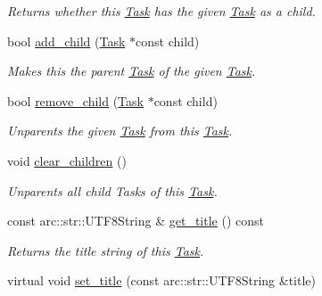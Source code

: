 \begin{DoxyCompactItemize}
\begin{DoxyCompactList}\small\item\em Returns whether this \hyperlink{classsigma_1_1core_1_1tasks_1_1_task}{Task} has the given \hyperlink{classsigma_1_1core_1_1tasks_1_1_task}{Task} as a child. \end{DoxyCompactList}\item 
bool \hyperlink{classsigma_1_1core_1_1tasks_1_1_task_abac88c4ddaf54ae20aab497e95023f9e}{add\-\_\-child} (\hyperlink{classsigma_1_1core_1_1tasks_1_1_task}{Task} $\ast$const child)
\begin{DoxyCompactList}\small\item\em Makes this the parent \hyperlink{classsigma_1_1core_1_1tasks_1_1_task}{Task} of the given \hyperlink{classsigma_1_1core_1_1tasks_1_1_task}{Task}. \end{DoxyCompactList}\item 
bool \hyperlink{classsigma_1_1core_1_1tasks_1_1_task_a9df7e8a262b51b440cc6a45dbe219810}{remove\-\_\-child} (\hyperlink{classsigma_1_1core_1_1tasks_1_1_task}{Task} $\ast$const child)
\begin{DoxyCompactList}\small\item\em Unparents the given \hyperlink{classsigma_1_1core_1_1tasks_1_1_task}{Task} from this \hyperlink{classsigma_1_1core_1_1tasks_1_1_task}{Task}. \end{DoxyCompactList}\item 
void \hyperlink{classsigma_1_1core_1_1tasks_1_1_task_acb08acc571c5e0678d27d52a18a7db5e}{clear\-\_\-children} ()
\begin{DoxyCompactList}\small\item\em Unparents all child Tasks of this \hyperlink{classsigma_1_1core_1_1tasks_1_1_task}{Task}. \end{DoxyCompactList}\item 
\hypertarget{classsigma_1_1core_1_1tasks_1_1_task_a96211028a099261a5f044462343c6089}{const arc\-::str\-::\-U\-T\-F8\-String \& \hyperlink{classsigma_1_1core_1_1tasks_1_1_task_a96211028a099261a5f044462343c6089}{get\-\_\-title} () const }\label{classsigma_1_1core_1_1tasks_1_1_task_a96211028a099261a5f044462343c6089}

\begin{DoxyCompactList}\small\item\em Returns the title string of this \hyperlink{classsigma_1_1core_1_1tasks_1_1_task}{Task}. \end{DoxyCompactList}\item 
\hypertarget{classsigma_1_1core_1_1tasks_1_1_task_af609f0eab85e4291630c4d71e393cef1}{virtual void \hyperlink{classsigma_1_1core_1_1tasks_1_1_task_af609f0eab85e4291630c4d71e393cef1}{set\-\_\-title} (const arc\-::str\-::\-U\-T\-F8\-String \&title)}\label{classsigma_1_1core_1_1tasks_1_1_task_af609f0eab85e4291630c4d71e393cef1}


\end{DoxyCompactItemize}
